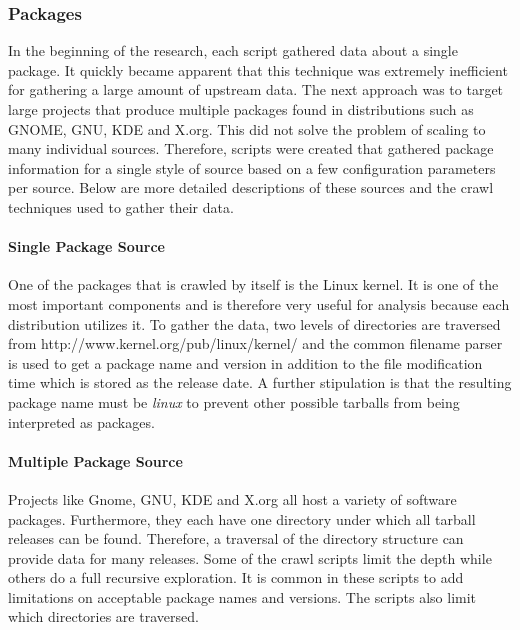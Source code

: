 \documentclass[letterpaper,10pt]{article}
\begin{document}
\subsubsection{Packages}
In the beginning of the research, each script gathered data about a single package.  It quickly became apparent that this technique was extremely inefficient for gathering a large amount of upstream data.  The next approach was to target large projects that produce multiple packages found in distributions such as GNOME, GNU, KDE and X.org.  This did not solve the problem of scaling to many individual sources.  Therefore, scripts were created that gathered package information for a single style of source based on a few configuration parameters per source.  Below are more detailed descriptions of these sources and the crawl techniques used to gather their data.
\paragraph{Single Package Source}
One of the packages that is crawled by itself is the Linux kernel.  It is one of the most important components and is therefore very useful for analysis because each distribution utilizes it.  To gather the data, two levels of directories are traversed from http://www.kernel.org/pub/linux/kernel/ and the common filename parser is used to get a package name and version in addition to the file modification time which is stored as the release date.  A further stipulation is that the resulting package name must be \emph{linux} to prevent other possible tarballs from being interpreted as packages.
\paragraph{Multiple Package Source}
Projects like Gnome, GNU, KDE and X.org all host a variety of software packages.  Furthermore, they each have one directory under which all tarball releases can be found.  Therefore, a traversal of the directory structure can provide data for many releases.  Some of the crawl scripts limit the depth while others do a full recursive exploration.  It is common in these scripts to add limitations on acceptable package names and versions.  The scripts also limit which directories are traversed.
\end{document}
